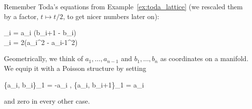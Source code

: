 \documentclass[main.tex]{subfiles}
\begin{document}
\begin{example}
	Remember Toda's equations from Example~\ref{ex:toda_lattice} (we rescaled them by a factor, $t\mapsto t/2$,  to get nicer numbers later on):
	\begin{eqalign}
		\begin{cases}
			_i = a_i (b_{i+1} - b_i)\\
			_i = 2(a_i^2 - a_{i-1}^2)
		\end{cases}
	\end{eqalign}
	Geometrically, we think of $a_1, \ldots, a_{n-1}$ and $b_1, \ldots, b_n$ as coordinates on a manifold. We equip it with a Poisson structure by setting
	\begin{eqalign}
	\label{eq:poiss_struct_toda}
		\{a_i, b_i\}_1 = -a_i \quad , \quad \{a_i, b_{i+1}\}_1 = a_i
	\end{eqalign}
	and zero in every other case.


\end{example}
\end{document}
